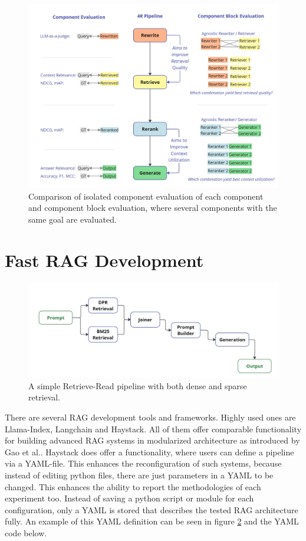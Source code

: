 \begin{figure}
  \centering
  \includegraphics[width=\textwidth]{images/ComponentBlockEvaluation.pdf}
  \caption{Comparison of isolated component evaluation of each component and component block evaluation, where several components with the same goal are evaluated.}
  \label{fig:componentblockeval}
\end{figure}

\section{Fast RAG Development}

\begin{figure}[b]
    \centering
    \includegraphics[width=\textwidth]{images/showcase-pipeline.pdf}
    \caption{A simple Retrieve-Read pipeline with both dense and sparse retrieval.}
    \label{fig:showcase}
\end{figure}


There are several RAG development tools and frameworks. Highly used ones are Llama-Index\cite{Liu_LlamaIndex_2022}, Langchain\cite{Chase_LangChain_2022} and Haystack\cite{Pietsch_Haystack_the_end-to-end_2019}. All of them offer comparable functionality for building advanced RAG systems in modularized architecture as introduced by Gao et al.\cite{Gao.18.12.2023}. Haystack does offer a functionality, where users can define a pipeline via a YAML-file. This enhances the reconfiguration of such systems, because instead of editing python files, there are just parameters in a YAML to be changed. This enhances the ability to report the methodologies of each experiment too. Instead of saving a python script or module for each configuration, only a YAML is stored that describes the tested RAG architecture fully. An example of this YAML definition can be seen in figure \ref{fig:showcase} and the YAML code below.

